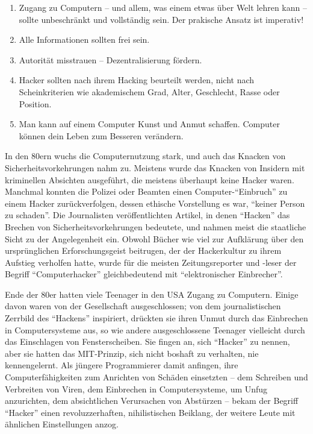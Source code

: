 \begin{enumerate}\item Zugang zu Computern – und allem, was einem etwas über Welt lehren kann – sollte unbeschränkt und vollständig sein. Der prakische Ansatz ist imperativ!
\item Alle Informationen sollten frei sein.
\item Autorität misstrauen – Dezentralisierung fördern.
\item Hacker sollten nach ihrem Hacking beurteilt werden, nicht nach Scheinkriterien wie akademischem Grad, Alter, Geschlecht, Rasse oder Position.
\item Man kann auf einem Computer Kunst und Anmut schaffen. Computer können dein Leben zum Besseren verändern.
\end{enumerate}

In den 80ern wuchs die Computernutzung stark, und auch das Knacken von Sicherheitsvorkehrungen nahm zu. Meistens wurde das Knacken von Insidern mit kriminellen Absichten ausgeführt, die meistens überhaupt keine Hacker waren. Manchmal konnten die Polizei oder Beamten einen Computer-"`Einbruch"' zu einem Hacker zurückverfolgen, dessen ethische Vorstellung es war, "`keiner Person zu schaden"'. Die Journalisten veröffentlichten Artikel, in denen "`Hacken"' das Brechen von Sicherheitsvorkehrungen bedeutete, und nahmen meist die staatliche Sicht zu der Angelegenheit ein. Obwohl Bücher wie  viel zur Aufklärung über den ursprünglichen Erforschungsgeist beitrugen, der der Hackerkultur zu ihrem Aufstieg verholfen hatte, wurde für die meisten Zeitungsreporter und -leser der Begriff "`Computerhacker"' gleichbedeutend mit "`elektronischer Einbrecher"'.

Ende der 80er hatten viele Teenager in den USA Zugang zu Computern. Einige davon waren von der Gesellschaft ausgeschlossen; von dem journalistischen Zerrbild des "`Hackens"' inspiriert, drückten sie ihren Unmut durch das Einbrechen in Computersysteme aus, so wie andere ausgeschlossene Teenager vielleicht durch das Einschlagen von Fensterscheiben. Sie fingen an, sich "`Hacker"' zu nennen, aber sie hatten das MIT-Prinzip, sich nicht boshaft zu verhalten, nie kennengelernt.
Als jüngere Programmierer damit anfingen, ihre Computerfähigkeiten zum Anrichten von Schäden einsetzten – dem Schreiben und Verbreiten von Viren, dem Einbrechen in Computersysteme, um Unfug anzurichten, dem absichtlichen Verursachen von Abstürzen – bekam der Begriff "`Hacker"' einen revoluzzerhaften, nihilistischen Beiklang, der weitere Leute mit ähnlichen Einstellungen anzog.

